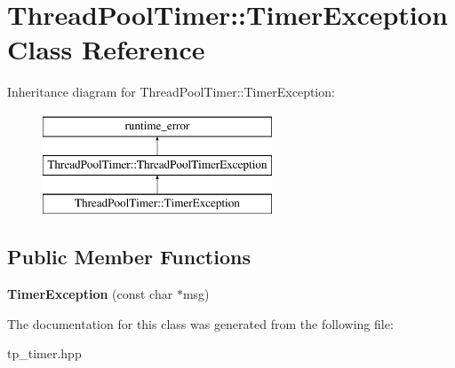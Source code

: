 \hypertarget{classThreadPoolTimer_1_1TimerException}{\section{Thread\-Pool\-Timer\-:\-:Timer\-Exception Class Reference}
\label{classThreadPoolTimer_1_1TimerException}
}
Inheritance diagram for Thread\-Pool\-Timer\-:\-:Timer\-Exception\-:\begin{figure}[H]
\begin{center}
\leavevmode
\includegraphics[height=3.000000cm]{classThreadPoolTimer_1_1TimerException}
\end{center}
\end{figure}
\subsection*{Public Member Functions}
\begin{DoxyCompactItemize}
\item 
\hypertarget{classThreadPoolTimer_1_1TimerException_aa64e837274d9cc224de2bbe0d5e9a3b9}{{\bfseries Timer\-Exception} (const char $\ast$msg)}\label{classThreadPoolTimer_1_1TimerException_aa64e837274d9cc224de2bbe0d5e9a3b9}

\end{DoxyCompactItemize}


The documentation for this class was generated from the following file\-:\begin{DoxyCompactItemize}
\item 
tp\-\_\-timer.\-hpp\end{DoxyCompactItemize}
